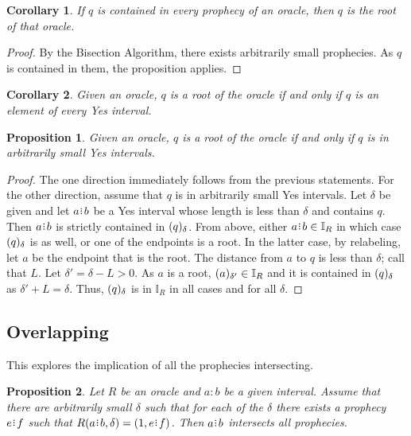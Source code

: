 \documentclass[12pt]{article}
\newtheorem{corollary}{Corollary}[section]
\newtheorem{proposition}{Proposition}[section]
\begin{document}
\begin{corollary}\label{os-root}
    If $q$ is contained in every prophecy of an oracle, then $q$ is the root of that oracle. 
\end{corollary}

\begin{proof}
    By the Bisection Algorithm, there exists arbitrarily small prophecies. As $q$ is contained in them, the proposition applies. 
\end{proof}



\begin{corollary}
    Given an oracle, $q$ is a root of the oracle if and only if $q$ is an element of every Yes interval. 
\end{corollary}

\begin{proposition}
    Given an oracle, $q$ is a root of the oracle if and only if $q$ is in arbitrarily small Yes intervals. 
\end{proposition}

\begin{proof}
   The one direction immediately follows from the previous statements. For the other direction, assume that $q$ is in arbitrarily small Yes intervals. Let $\delta$ be given and let $a\rint b$ be a Yes interval whose length is less than $\delta$ and contains $q$. Then $a\rint b$ is strictly contained in $\halo{q}$. From above, either $a\rint b \in \mathbb{I}_R$ in which case $\halo{q}$ is as well, or one of the endpoints is a root. In the latter case, by relabeling, let $a$ be the endpoint that is the root. The distance from $a$ to $q$ is less than $\delta$; call that $L$. Let $\delta' = \delta - L > 0$. As $a$ is a root, $\halo[\delta']{a} \in \mathbb{I}_R$ and it is contained in $\halo{q}$ as $\delta' + L = \delta$. Thus, $\halo{q}$ is in $\mathbb{I}_R$ in all cases and for all $\delta$.
\end{proof}


\subsection{Overlapping}


This explores the implication of all the prophecies intersecting. 

\begin{proposition}
    Let $R$ be an oracle and $a:b$ be a given interval. Assume that there are arbitrarily small $\delta$ such that for each of the $\delta$ there exists a prophecy $e\rint f$ such that $R(a \rint b, \delta) = (1, e\rint f)$. Then $a\rint b$ intersects all prophecies. 
\end{proposition}
\end{document}
